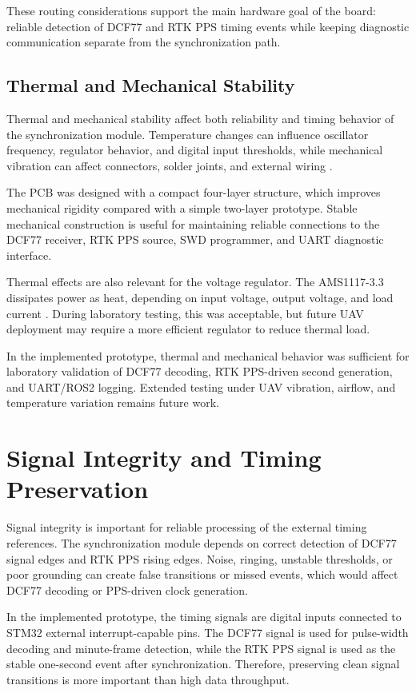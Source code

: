 These routing considerations support the main hardware goal of the board: reliable detection of DCF77 and RTK PPS timing events while keeping diagnostic communication separate from the synchronization path.

\subsection{Thermal and Mechanical Stability}

Thermal and mechanical stability affect both reliability and timing behavior of the synchronization module. Temperature changes can influence oscillator frequency, regulator behavior, and digital input thresholds, while mechanical vibration can affect connectors, solder joints, and external wiring \cite{allan1966statistics,levine2012atomic}.

The PCB was designed with a compact four-layer structure, which improves mechanical rigidity compared with a simple two-layer prototype. Stable mechanical construction is useful for maintaining reliable connections to the DCF77 receiver, RTK PPS source, SWD programmer, and UART diagnostic interface.

Thermal effects are also relevant for the voltage regulator. The AMS1117-3.3 dissipates power as heat, depending on input voltage, output voltage, and load current \cite{ams1117Datasheet}. During laboratory testing, this was acceptable, but future UAV deployment may require a more efficient regulator to reduce thermal load.

In the implemented prototype, thermal and mechanical behavior was sufficient for laboratory validation of DCF77 decoding, RTK PPS-driven second generation, and UART/ROS2 logging. Extended testing under UAV vibration, airflow, and temperature variation remains future work.

\section{Signal Integrity and Timing Preservation}

Signal integrity is important for reliable processing of the external timing references. The synchronization module depends on correct detection of DCF77 signal edges and RTK PPS rising edges. Noise, ringing, unstable thresholds, or poor grounding can create false transitions or missed events, which would affect DCF77 decoding or PPS-driven clock generation.

In the implemented prototype, the timing signals are digital inputs connected to STM32 external interrupt-capable pins. The DCF77 signal is used for pulse-width decoding and minute-frame detection, while the RTK PPS signal is used as the stable one-second event after synchronization. Therefore, preserving clean signal transitions is more important than high data throughput.

